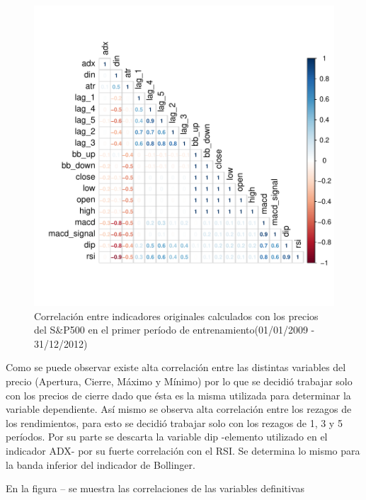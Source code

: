 \documentclass[a4paper,12pt]{Latex/Classes/PhDthesisPSnPDF}
\begin{document}
\begin{figure}[H]
\centering
\includegraphics{main-003}
\caption{Correlación entre indicadores originales calculados con los precios del S\&P500 en el primer período de entrenamiento(01/01/2009 - 31/12/2012)}
\end{figure}

Como se puede observar existe alta correlación entre las distintas variables del precio (Apertura, Cierre, Máximo y Mínimo) por lo que se decidió trabajar solo con los precios de cierre dado que ésta es la misma utilizada para determinar la variable dependiente. Así mismo se observa alta correlación entre los rezagos de los rendimientos, para esto se decidió trabajar solo con los rezagos de 1, 3 y 5 períodos. Por su parte se descarta la variable dip -elemento utilizado en el indicador ADX- por su fuerte correlación con el RSI. Se determina lo mismo para la banda inferior del indicador de Bollinger.

En la figura -- se muestra las correlaciones de las variables definitivas
\end{document}
